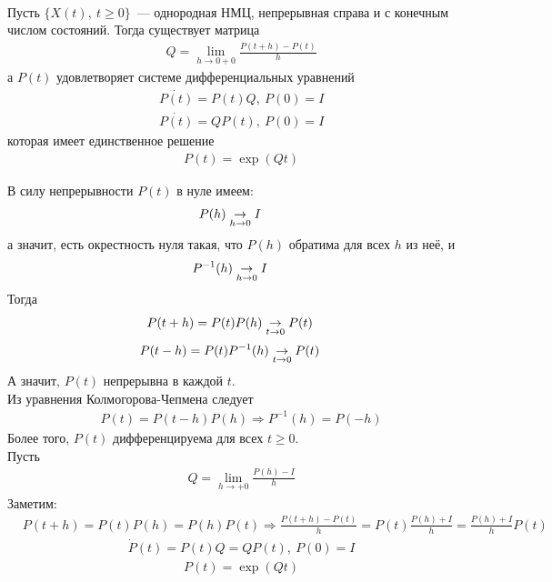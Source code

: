 \begin{theorem}~
    \\
    Пусть $\{X(t), \ t\geq 0\}$~--- однородная НМЦ, непрерывная справа и с
    конечным числом состояний. Тогда существует матрица
    \begin{align*}
      & Q = \lim_{h \to 0+0}\frac{P(t+h)-P(t)}{h}
    \end{align*}
    а $P(t)$ удовлетворяет системе дифференциальных уравнений
    \begin{align*}
      & \dot{P(t)} = P(t)Q, \ P(0) = I \\
      & \dot{P(t)} = QP(t), \ P(0) = I
    \end{align*}
    которая имеет единственное решение
    \begin{align*}
      & P(t) = \exp\left( Qt \right)
    \end{align*}
\end{theorem}
\begin{Proof}
    В силу непрерывности $P(t)$ в нуле имеем:
    \begin{align*}
      & P(h) \underset{h\to 0}\rightarrow I
    \end{align*}
    а значит, есть окрестность нуля такая, что $P(h)$ обратима для всех $h$ из
    неё, и
    \begin{align*}
      & P^{-1}(h) \underset{h\to 0}\rightarrow I
    \end{align*}
    Тогда
    \begin{align*}
      & P(t+h)  = P(t)P(h) \underset{t\to 0}\rightarrow P(t)
    \end{align*}
    \begin{align*}
      & P(t-h)  = P(t)P^{-1}(h) \underset{t\to 0}\rightarrow P(t)
    \end{align*}
    А значит, $P(t)$ непрерывна в каждой $t$.
    \\
    Из уравнения Колмогорова-Чепмена следует
    \begin{align*}
      & P(t) = P(t-h)P(h) \Rightarrow P^{-1}(h) = P(-h)
    \end{align*}
    Более того, $P(t)$ дифференцируема для всех $t \geq 0$.
    \\
    Пусть
    \begin{align*}
      & Q = \lim_{h \to +0}\frac{P(h)-I}{h}
    \end{align*}
    Заметим:
    \begin{align*}
      & P(t+h) = P(t)P(h) = P(h)P(t) \Rightarrow \frac{P(t+h)-P(t)}{h} = P(t)\frac{P(h)+I}{h} = \frac{P(h)+I}{h}P(t)
    \end{align*}
    \begin{align*}
      & \dot{P}(t) = P(t)Q=QP(t), \ P(0) = I
    \end{align*}
    \begin{align*}
      & P(t) = \exp(Qt)
    \end{align*}
\end{Proof}
